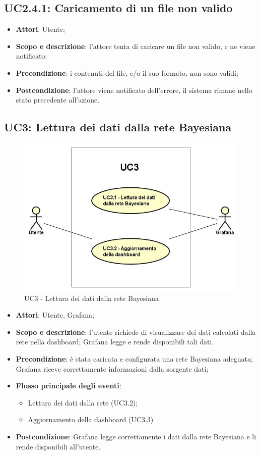 \subsection{UC2.4.1: Caricamento di un file non valido}
\hypertarget{UC2.4.1}{}
\begin{itemize}
	\item \textbf{Attori}: Utente;
	\item \textbf{Scopo e descrizione}: l'attore tenta di caricare un file non valido, e ne viene notificato;
	\item \textbf{Precondizione}: i contenuti del file, e/o il suo formato, non sono validi;
	\item \textbf{Postcondizione}: l'attore viene notificato dell'errore, il sistema rimane nello stato precedente all'azione.
\end{itemize}

\subsection{UC3: Lettura dei dati dalla rete Bayesiana}
\hypertarget{UC3}{}
\begin{figure} [H]
	\centering
	\includegraphics[scale=0.45]{Img/UC3}
	\caption{UC3 - Lettura dei dati dalla rete Bayesiana}\label{}
\end{figure}
\begin{itemize}
	\item \textbf{Attori}: Utente, Grafana;
	\item \textbf{Scopo e descrizione}: l'utente richiede di visualizzare dei dati calcolati dalla rete nella dashboard; Grafana legge e rende disponibili tali dati.
	\item \textbf{Precondizione}: è stata caricata e configurata una rete Bayesiana adeguata; Grafana riceve correttamente informazioni dalla sorgente dati;
	\item \textbf{Flusso principale degli eventi}:
	\begin{itemize}
		\item Lettura dei dati dalla rete (UC3.2);
		\item Aggiornamento della dashboard (UC3.3)
	\end{itemize}
	\item \textbf{Postcondizione}: Grafana legge correttamente i dati dalla rete Bayesiana e li rende disponibili all'utente.
\end{itemize}
